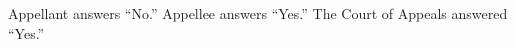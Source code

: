 \documentclass[12pt,\documentclassflag]{michiganCourtOfAppealsBrief}
\begin{document}
\noindent Appellant answers ``No.'' Appellee answers ``Yes.'' The Court of Appeals answered ``Yes.''

















\end{document}
